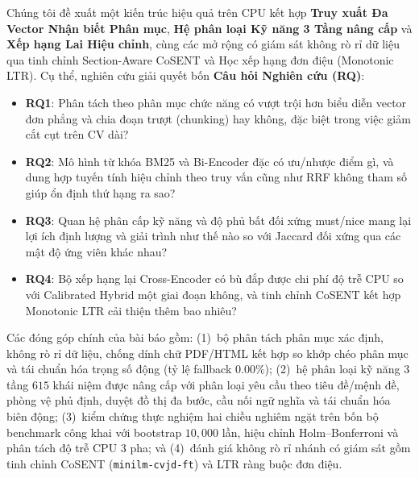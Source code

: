 Chúng tôi đề xuất một kiến trúc hiệu quả trên CPU kết hợp \textbf{Truy xuất Đa Vector Nhận biết Phân mục}, \textbf{Hệ phân loại Kỹ năng 3 Tầng nâng cấp} và \textbf{Xếp hạng Lai Hiệu chỉnh}, cùng các mở rộng có giám sát không rò rỉ dữ liệu qua tinh chỉnh Section-Aware CoSENT và Học xếp hạng đơn điệu (Monotonic LTR). Cụ thể, nghiên cứu giải quyết bốn \textbf{Câu hỏi Nghiên cứu (RQ)}:
\begin{itemize}
    \item \textbf{RQ1}: Phân tách theo phân mục chức năng có vượt trội hơn biểu diễn vector đơn phẳng và chia đoạn trượt (chunking) hay không, đặc biệt trong việc giảm cắt cụt trên CV dài?
    \item \textbf{RQ2}: Mô hình từ khóa BM25 và Bi-Encoder đặc có ưu/nhược điểm gì, và dung hợp tuyến tính hiệu chỉnh theo truy vấn cũng như RRF không tham số giúp ổn định thứ hạng ra sao?
    \item \textbf{RQ3}: Quan hệ phân cấp kỹ năng và độ phủ bất đối xứng must/nice mang lại lợi ích định lượng và giải trình như thế nào so với Jaccard đối xứng qua các mật độ ứng viên khác nhau?
    \item \textbf{RQ4}: Bộ xếp hạng lại Cross-Encoder có bù đắp được chi phí độ trễ CPU so với Calibrated Hybrid một giai đoạn không, và tinh chỉnh CoSENT kết hợp Monotonic LTR cải thiện thêm bao nhiêu?
\end{itemize}

Các đóng góp chính của bài báo gồm: (1)~bộ phân tách phân mục xác định, không rò rỉ dữ liệu, chống dính chữ PDF/HTML kết hợp so khớp chéo phân mục và tái chuẩn hóa trọng số động (tỷ lệ fallback $0.00\%$); (2)~hệ phân loại kỹ năng 3 tầng $615$ khái niệm được nâng cấp với phân loại yêu cầu theo tiêu đề/mệnh đề, phòng vệ phủ định, duyệt đồ thị đa bước, cầu nối ngữ nghĩa và tái chuẩn hóa biên động; (3)~kiểm chứng thực nghiệm hai chiều nghiêm ngặt trên bốn bộ benchmark công khai với bootstrap $10{,}000$ lần, hiệu chỉnh Holm--Bonferroni và phân tách độ trễ CPU 3 pha; và (4)~đánh giá không rò rỉ nhánh có giám sát gồm tinh chỉnh CoSENT (\texttt{minilm-cvjd-ft}) và LTR ràng buộc đơn điệu.
